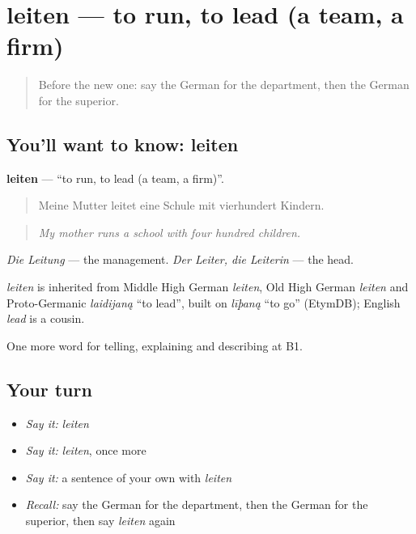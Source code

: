 \section[leiten]{leiten — to run, to lead (a team, a firm)}

\label{lesson:GE-C353-leiten}



\begin{quote}
Before the new one: say the German for the department, then the German for the superior.
\end{quote}

\subsection*{You'll want to know: leiten}
\textbf{leiten} — \textquotedblleft{}to run, to lead (a team, a firm)\textquotedblright{}.

\begin{quote}
Meine Mutter leitet eine Schule mit vierhundert Kindern.
\end{quote}

\begin{quote}
\emph{My mother runs a school with four hundred children.}
\end{quote}

\emph{Die Leitung} — the management. \emph{Der Leiter, die Leiterin} — the head.

\begin{cousinweb}
\emph{leiten} is inherited from Middle High German \emph{leiten}, Old High German \emph{leiten} and Proto-Germanic \emph{laidijaną} \textquotedblleft{}to lead\textquotedblright{}, built on \emph{līþaną} \textquotedblleft{}to go\textquotedblright{} (EtymDB); English \emph{lead} is a cousin.
\end{cousinweb}

\begin{grammarlens}[title={What you've built}]
One more word for telling, explaining and describing at B1.
\end{grammarlens}

\subsection*{Your turn}
\begin{itemize}
\raggedright
  \item \emph{Say it:} \emph{leiten}
  \item \emph{Say it:} \emph{leiten}, once more
  \item \emph{Say it:} a sentence of your own with \emph{leiten}
  \item \emph{Recall:} say the German for the department, then the German for the superior, then say \emph{leiten} again
\end{itemize}

